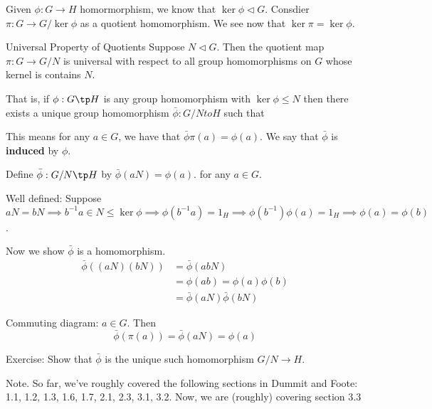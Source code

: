 \documentclass{article}
\begin{document}
Given $\phi : G \to H$ homormorphism, we know that $\ker{\phi} \triangleleft G$. Consdier $\pi : G \to G / \ker{\phi}$ as a quotient homomorphism. We see now that $\ker{\pi} = \ker{\phi}$.

\begin{cthm}{Universal Property of Quotients}{}
    Suppose $N \triangleleft G$. Then the quotient map $\pi : G \to G /N$ is universal with respect to all group homomorphisms on $G$ whose kernel is contains $N$. 

    That is, if $\phi : G \tp H$ is any group homomorphism with $\ker{\phi} \leq N$ then there exists a unique group homomorphism $\bar{\phi} : G/N to H$ such that
    


    This means for any $a \in G$, we have that $\bar{\phi} \pi(a) = \phi(a)$. We say that $\bar{\phi}$ is \textbf{induced} by $\phi$. 

    \begin{cpf}
        Define $\bar{\phi} : G/N \tp H$ by $\bar{\phi}(aN) = \phi(a)$. for any $a \in G$. 

        Well defined: Suppose $aN = bN \implies b^{-1}a \in N \leq \ker{\phi} \implies \phi(b^{-1}a) = 1_H \implies \phi(b^{-1})\phi(a) = 1_H \implies \phi(a) = \phi(b)$. 

        Now we show $\bar{\phi}$ is a homomorphism. 
        \begin{align*}
            \bar{\phi}\left( (aN)(bN) \right) & = \bar{\phi}(abN)\\
            & = \phi(ab) = \phi(a)\phi(b)\\
            & = \bar{\phi}(aN) \bar{\phi}(bN)
        \end{align*}

        Commuting diagram: $a \in G$. Then 
        \[
            \bar{\phi}(\pi(a)) = \bar{ \phi}(aN) = \phi(a)
        \]

        Exercise: Show that $\bar{\phi}$ is the unique such homomorphism $G/N \to H$. 
    \end{cpf}
\end{cthm}


Note. So far, we've roughly covered the following sections in Dummit and Foote: 1.1, 1.2, 1.3, 1.6, 1.7, 2.1, 2.3, 3.1, 3.2. Now, we are (roughly) covering section 3.3
\end{document}
